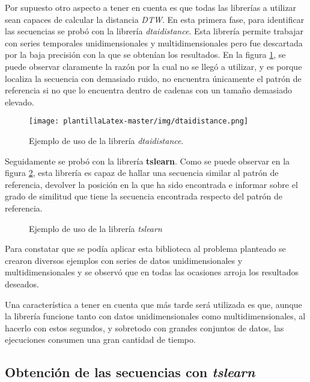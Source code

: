 Por supuesto otro aspecto a tener en cuenta es que todas las librerías a utilizar sean capaces de calcular la distancia \emph{DTW}. En esta primera fase, para identificar las secuencias se probó con la librería \textit{dtaidistance}. Esta librería permite trabajar con series temporales unidimensionales y multidimensionales pero fue descartada por la baja precisión con la que se obtenían los resultados. En la figura \ref{fig:dtaidistance}, se puede observar claramente la razón por la cual no se llegó a utilizar, y es porque localiza la secuencia con demasiado ruido, no encuentra únicamente el patrón de referencia si no que lo encuentra dentro de cadenas con un tamaño demasiado elevado.

\begin{figure}
    \centering
    \texttt{[image: plantillaLatex-master/img/dtaidistance.png]}
    \caption{Ejemplo de uso de la librería \textit{dtaidistance}.}
    \label{fig:dtaidistance}
\end{figure}

Seguidamente se probó con la librería \textbf{tslearn}. Como se puede observar en la figura \ref{f:tslearn}, esta librería es capaz de hallar una secuencia similar al patrón de referencia, devolver la posición en la que ha sido encontrada e informar sobre el grado de similitud que tiene la secuencia encontrada respecto del patrón de referencia. 

\begin{figure}
 \centering
  \vspace{1mm}
 \caption{Ejemplo de uso de la librería \textit{tslearn}}
 \label{f:tslearn}
\end{figure}

Para constatar que se podía aplicar esta biblioteca al problema planteado se crearon diversos ejemplos con series de datos unidimensionales y multidimensionales y se observó que en todas las ocasiones arroja los resultados deseados.

Una característica a tener en cuenta que más tarde será utilizada es que, aunque la librería funcione tanto con datos unidimensionales como multidimensionales, al hacerlo con estos segundos, y sobretodo con grandes conjuntos de datos, las ejecuciones consumen una gran cantidad de tiempo. 

\subsection{Obtención de las secuencias con \textit{tslearn}}

